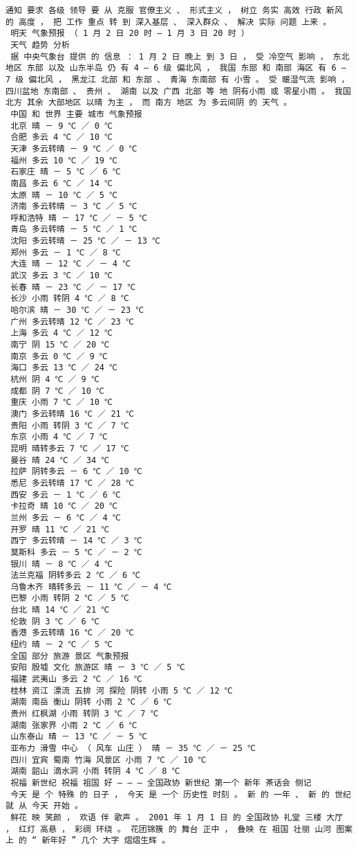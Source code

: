 \documentclass{article}
\begin{document}
\begin{Verbatim}[commandchars=\\\{\}]
 通知 要求 各级 领导 要 从 克服 官僚主义 、 形式主义 ， 树立 务实 高效 行政 新风 的 高度 ， 把 工作 重点 转 到 深入基层 、 深入群众 、 解决 实际 问题 上来 。 
 明天 气象预报 （ 1 月 2 日 20 时 — 1 月 3 日 20 时 ） 
 天气 趋势 分析 
 据 中央气象台 提供 的 信息 ： 1 月 2 日 晚上 到 3 日 ， 受 冷空气 影响 ， 东北地区 东部 以及 山东半岛 仍 有 4 — 6 级 偏北风 ， 我国 东部 和 南部 海区 有 6 — 7 级 偏北风 ， 黑龙江 北部 和 东部 、 青海 东南部 有 小雪 。 受 暖湿气流 影响 ， 四川盆地 东南部 、 贵州 、 湖南 以及 广西 北部 等 地 阴有小雨 或 零星小雨 。 我国 北方 其余 大部地区 以晴 为主 ， 而 南方 地区 为 多云间阴 的 天气 。 
 中国 和 世界 主要 城市 气象预报 
 北京 晴 － 9 ℃ ／ 0 ℃ 
 合肥 多云 4 ℃ ／ 10 ℃ 
 天津 多云转晴 － 9 ℃ ／ 0 ℃ 
 福州 多云 10 ℃ ／ 19 ℃ 
 石家庄 晴 － 5 ℃ ／ 6 ℃ 
 南昌 多云 6 ℃ ／ 14 ℃ 
 太原 晴 － 10 ℃ ／ 5 ℃ 
 济南 多云转晴 － 3 ℃ ／ 5 ℃ 
 呼和浩特 晴 － 17 ℃ ／ － 5 ℃ 
 青岛 多云转晴 － 5 ℃ ／ 1 ℃ 
 沈阳 多云转晴 － 25 ℃ ／ － 13 ℃ 
 郑州 多云 － 1 ℃ ／ 8 ℃ 
 大连 晴 － 12 ℃ ／ － 4 ℃ 
 武汉 多云 3 ℃ ／ 10 ℃ 
 长春 晴 － 23 ℃ ／ － 17 ℃ 
 长沙 小雨 转阴 4 ℃ ／ 8 ℃ 
 哈尔滨 晴 － 30 ℃ ／ － 23 ℃ 
 广州 多云转晴 12 ℃ ／ 23 ℃ 
 上海 多云 4 ℃ ／ 12 ℃ 
 南宁 阴 15 ℃ ／ 20 ℃ 
 南京 多云 0 ℃ ／ 9 ℃ 
 海口 多云 13 ℃ ／ 24 ℃ 
 杭州 阴 4 ℃ ／ 9 ℃ 
 成都 阴 7 ℃ ／ 10 ℃ 
 重庆 小雨 7 ℃ ／ 10 ℃ 
 澳门 多云转晴 16 ℃ ／ 21 ℃ 
 贵阳 小雨 转阴 3 ℃ ／ 7 ℃ 
 东京 小雨 4 ℃ ／ 7 ℃ 
 昆明 晴转多云 7 ℃ ／ 17 ℃ 
 曼谷 晴 24 ℃ ／ 34 ℃ 
 拉萨 阴转多云 － 6 ℃ ／ 10 ℃ 
 悉尼 多云转晴 17 ℃ ／ 28 ℃ 
 西安 多云 － 1 ℃ ／ 6 ℃ 
 卡拉奇 晴 10 ℃ ／ 20 ℃ 
 兰州 多云 － 6 ℃ ／ 4 ℃ 
 开罗 晴 11 ℃ ／ 21 ℃ 
 西宁 多云转晴 － 14 ℃ ／ 3 ℃ 
 莫斯科 多云 － 5 ℃ ／ － 2 ℃ 
 银川 晴 － 8 ℃ ／ 4 ℃ 
 法兰克福 阴转多云 2 ℃ ／ 6 ℃ 
 乌鲁木齐 晴转多云 － 11 ℃ ／ － 4 ℃ 
 巴黎 小雨 转阴 2 ℃ ／ 5 ℃ 
 台北 晴 14 ℃ ／ 21 ℃ 
 伦敦 阴 3 ℃ ／ 6 ℃ 
 香港 多云转晴 16 ℃ ／ 20 ℃ 
 纽约 晴 － 2 ℃ ／ 5 ℃ 
 全国 部分 旅游 景区 气象预报 
 安阳 殷墟 文化 旅游区 晴 － 3 ℃ ／ 5 ℃ 
 福建 武夷山 多云 2 ℃ ／ 16 ℃ 
 桂林 资江 漂流 五排 河 探险 阴转 小雨 5 ℃ ／ 12 ℃ 
 湖南 南岳 衡山 阴转 小雨 2 ℃ ／ 6 ℃ 
 贵州 红枫湖 小雨 转阴 3 ℃ ／ 7 ℃ 
 湖南 张家界 小雨 2 ℃ ／ 6 ℃ 
 山东泰山 晴 － 13 ℃ ／ － 5 ℃ 
 亚布力 滑雪 中心 （ 风车 山庄 ） 晴 － 35 ℃ ／ － 25 ℃ 
 四川 宜宾 蜀南 竹海 风景区 小雨 7 ℃ ／ 10 ℃ 
 湖南 韶山 滴水洞 小雨 转阴 4 ℃ ／ 8 ℃ 
 祝福 新世纪 祝福 祖国 好 — — — 全国政协 新世纪 第一个 新年 茶话会 侧记 
 今天 是 个 特殊 的 日子 ， 今天 是 一个 历史性 时刻 。 新 的 一年 、 新 的 世纪 就 从 今天 开始 。 
 鲜花 映 笑颜 ， 欢语 伴 歌声 。 2001 年 1 月 1 日 的 全国政协 礼堂 三楼 大厅 ， 红灯 高悬 ， 彩绸 环绕 。 花团锦簇 的 舞台 正中 ， 叠映 在 祖国 壮丽 山河 图案 上 的 “ 新年好 ” 几个 大字 熠熠生辉 。 

\end{Verbatim}
\end{document}
